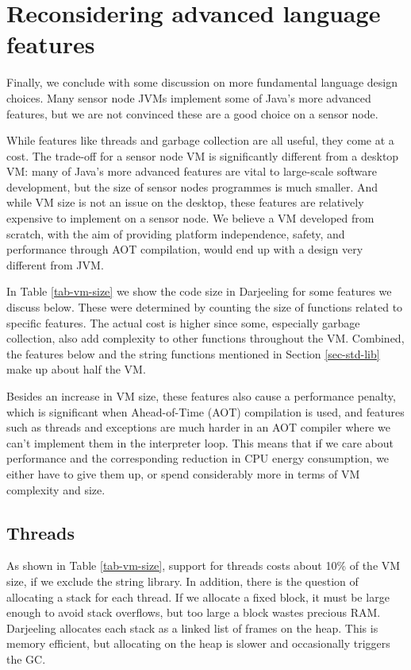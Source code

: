 \section{Reconsidering advanced language features}
\label{sec-advanced-features}
Finally, we conclude with some discussion on more fundamental language design choices. Many sensor node JVMs implement some of Java's more advanced features, but we are not convinced these are a good choice on a sensor node.

While features like threads and garbage collection are all useful, they come at a cost. The trade-off for a sensor node VM is significantly different from a desktop VM: many of Java's more advanced features are vital to large-scale software development, but the size of sensor nodes programmes is much smaller. And while VM size is not an issue on the desktop, these features are relatively expensive to implement on a sensor node. We believe a VM developed from scratch, with the aim of providing platform independence, safety, and performance through AOT compilation, would end up with a design very different from JVM.

In Table \ref{tab-vm-size} we show the code size in Darjeeling for some features we discuss below. These were determined by counting the size of functions related to specific features. The actual cost is higher since some, especially garbage collection, also add complexity to other functions throughout the VM. Combined, the features below and the string functions mentioned in Section \ref{sec-std-lib} make up about half the VM.

Besides an increase in VM size, these features also cause a performance penalty, which is significant when Ahead-of-Time (AOT) compilation is used, and features such as threads and exceptions are much harder in an AOT compiler where we can't implement them in the interpreter loop. This means that if we care about performance and the corresponding reduction in CPU energy consumption, we either have to give them up, or spend considerably more in terms of VM complexity and size.


\subsection{Threads}
As shown in Table \ref{tab-vm-size}, support for threads costs about 10\% of the VM size, if we exclude the string library. In addition, there is the question of allocating a stack for each thread. If we allocate a fixed block, it must be large enough to avoid stack overflows, but too large a block wastes precious RAM. Darjeeling allocates each stack as a linked list of frames on the heap. This is memory efficient, but allocating on the heap is slower and occasionally triggers the GC.

